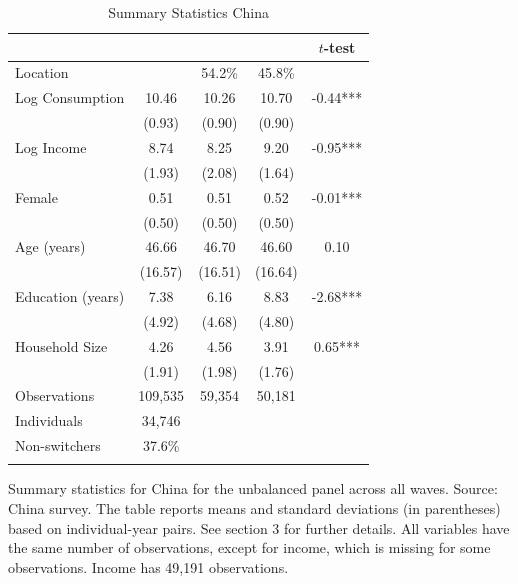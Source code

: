 \begin{table}[htbp] \centering \caption{Summary Statistics China}\label{tab:summary_stats_CHN_unb} \begin{threeparttable} \begin{tabular}{l cccc} \toprule
 &  &  &  & $t$-test \\
\midrule
Location &  &   54.2\% &   45.8\% &  \\  \addlinespace \addlinespace
Log Consumption & 10.46 & 10.26 & 10.70 & -0.44*** \\
 & (0.93) & (0.90) & (0.90) &  \\  \addlinespace
Log Income & 8.74 & 8.25 & 9.20 & -0.95*** \\
 & (1.93) & (2.08) & (1.64) &  \\  \addlinespace
Female & 0.51 & 0.51 & 0.52 & -0.01*** \\
 & (0.50) & (0.50) & (0.50) &  \\  \addlinespace
Age (years) & 46.66 & 46.70 & 46.60 & 0.10 \\
 & (16.57) & (16.51) & (16.64) &  \\  \addlinespace
Education (years) & 7.38 & 6.16 & 8.83 & -2.68*** \\
 & (4.92) & (4.68) & (4.80) &  \\  \addlinespace
Household Size & 4.26 & 4.56 & 3.91 & 0.65*** \\
 & (1.91) & (1.98) & (1.76) &  \\  \addlinespace


\cmidrule{2-5}
Observations & 109,535 & 59,354 & 50,181 &  \\  \addlinespace
Individuals & 34,746 &  &  &  \\
Non-switchers &   37.6\% &  &  &  \\  \addlinespace
\bottomrule \end{tabular} \begin{tablenotes}[flushleft] \footnotesize \item{Summary statistics for China for the unbalanced panel across all waves. Source: China survey. The table reports means and standard deviations (in parentheses) based on individual-year pairs. See section 3 for further details. All variables have the same number of observations, except for income, which is missing for some observations. Income has 49,191 observations.} \end{tablenotes} \end{threeparttable} \end{table}